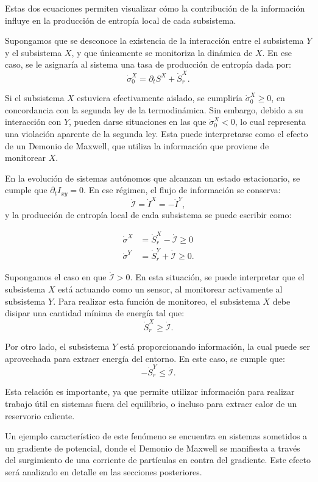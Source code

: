 Estas dos ecuaciones permiten visualizar cómo la contribución de la información influye en la producción de entropía local de cada subsistema.

Supongamos que se desconoce la existencia de la interacción entre el subsistema \( Y \) y el subsistema \( X \), y que únicamente se monitoriza la dinámica de \( X \). En ese caso, se le asignaría al sistema una tasa de producción de entropía dada por:
\[
\dot{\sigma}^{X}_0 = \partial_t S^X + \dot{S}_r^X.
\]

Si el subsistema \( X \) estuviera efectivamente aislado, se cumpliría \( \dot{\sigma}^{X}_0 \geq 0 \), en concordancia con la segunda ley de la termodinámica. Sin embargo, debido a su interacción con \( Y \), pueden darse situaciones en las que \( \dot{\sigma}^{X}_0 < 0 \), lo cual representa una violación aparente de la segunda ley. Esta puede interpretarse como el efecto de un Demonio de Maxwell, que utiliza la información que proviene de monitorear \(X \).

En la evolución de sistemas autónomos que alcanzan un estado estacionario, se cumple que \( \partial_t I_{xy} = 0 \). En ese régimen, el flujo de información se conserva:
\[
\dot{\mathcal{I}} = \dot{I}^{X} = -\dot{I}^{Y},
\]
y la producción de entropía local de cada subsistema se puede escribir como:


\begin{align*}
    \dot{\sigma}^{X} & = \dot{S}_{r}^{X} - \dot{\mathcal{I}} \geq 0 \\
    \dot{\sigma}^{Y} & =  \dot{S}_{r}^{Y} + \dot{\mathcal{I}} \geq 0 . 
\end{align*}

Supongamos el caso en que \( \dot{\mathcal{I}} > 0 \). En esta situación, se puede interpretar que el subsistema \( X \) está actuando como un sensor, al monitorear activamente al subsistema \( Y \). Para realizar esta función de monitoreo, el subsistema \( X \) debe disipar una cantidad mínima de energía tal que:
\[
\dot{S}_{r}^{X} \geq \dot{\mathcal{I}}.
\]

Por otro lado, el subsistema \( Y \) está proporcionando información, la cual puede ser aprovechada para extraer energía del entorno. En este caso, se cumple que:
\[
-\dot{S}_{r}^{Y} \leq \dot{\mathcal{I}}.
\]

Esta relación es importante, ya que permite utilizar información para realizar trabajo útil en sistemas fuera del equilibrio, o incluso para extraer calor de un reservorio caliente.

Un ejemplo característico de este fenómeno se encuentra en sistemas sometidos a un gradiente de potencial, donde el Demonio de Maxwell se manifiesta a través del surgimiento de una corriente de partículas en contra del gradiente. Este efecto será analizado en detalle en las secciones posteriores.


